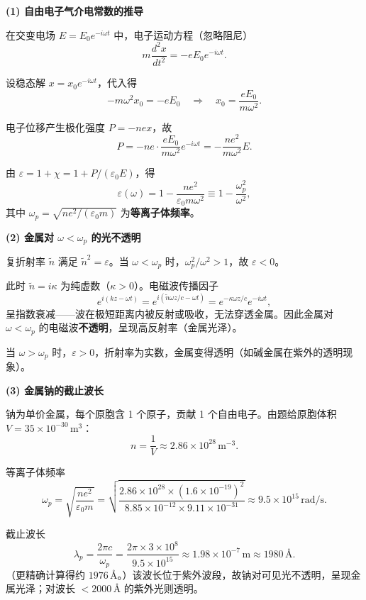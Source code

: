 \begin{derivationbox}[标准解题过程]
\textbf{(1) 自由电子气介电常数的推导}

在交变电场 $E=E_0e^{-i\omega t}$ 中，电子运动方程（忽略阻尼）
\begin{equation}
m\frac{d^2x}{dt^2}=-eE_0e^{-i\omega t}.
\end{equation}

设稳态解 $x=x_0e^{-i\omega t}$，代入得
\begin{equation}
-m\omega^2x_0=-eE_0\quad\Longrightarrow\quad x_0=\frac{eE_0}{m\omega^2}.
\end{equation}

电子位移产生极化强度 $P=-nex$，故
\begin{equation}
P=-n e\cdot\frac{eE_0}{m\omega^2}e^{-i\omega t}=-\frac{ne^2}{m\omega^2}E.
\end{equation}

由 $\varepsilon=1+\chi=1+P/(\varepsilon_0E)$，得
\begin{equation}
\boxed{\varepsilon(\omega)=1-\frac{ne^2}{\varepsilon_0m\omega^2}\equiv1-\frac{\omega_p^2}{\omega^2},}
\end{equation}
其中 $\omega_p=\sqrt{ne^2/(\varepsilon_0m)}$ 为\textbf{等离子体频率}。

\textbf{(2) 金属对 $\omega<\omega_p$ 的光不透明}

复折射率 $\tilde{n}$ 满足 $\tilde{n}^2=\varepsilon$。当 $\omega<\omega_p$ 时，$\omega_p^2/\omega^2>1$，故 $\varepsilon<0$。

此时 $\tilde{n}=i\kappa$ 为纯虚数（$\kappa>0$）。电磁波传播因子
\begin{equation}
e^{i(kz-\omega t)}=e^{i(\tilde{n}\omega z/c-\omega t)}=e^{-\kappa\omega z/c}e^{-i\omega t},
\end{equation}
呈指数衰减——波在极短距离内被反射或吸收，无法穿透金属。因此金属对 $\omega<\omega_p$ 的电磁波\textbf{不透明}，呈现高反射率（金属光泽）。

当 $\omega>\omega_p$ 时，$\varepsilon>0$，折射率为实数，金属变得透明（如碱金属在紫外的透明现象）。

\textbf{(3) 金属钠的截止波长}

钠为单价金属，每个原胞含 1 个原子，贡献 1 个自由电子。由题给原胞体积 $V=35\times10^{-30}\,\text{m}^3$：
\begin{equation}
n=\frac{1}{V}\approx2.86\times10^{28}\,\text{m}^{-3}.
\end{equation}

等离子体频率
\begin{equation}
\omega_p=\sqrt{\frac{ne^2}{\varepsilon_0m}}
=\sqrt{\frac{2.86\times10^{28}\times(1.6\times10^{-19})^2}{8.85\times10^{-12}\times9.11\times10^{-31}}}
\approx9.5\times10^{15}\,\text{rad/s}.
\end{equation}

截止波长
\begin{equation}
\lambda_p=\frac{2\pi c}{\omega_p}
=\frac{2\pi\times3\times10^8}{9.5\times10^{15}}
\approx\boxed{1.98\times10^{-7}\,\text{m}\approx1980\,\text{\AA}.}
\end{equation}
（更精确计算得约 $1976\,\text{\AA}$。）该波长位于紫外波段，故钠对可见光不透明，呈现金属光泽；对波长 $<2000\,\text{\AA}$ 的紫外光则透明。
\end{derivationbox}


